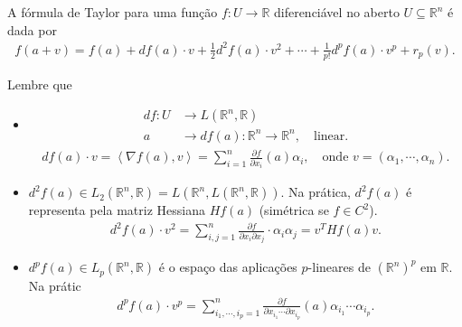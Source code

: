 A fórmula de Taylor para uma função $f:U\to\mathbb{R}$ diferenciável no aberto $U\subseteq \mathbb{R}^{n}$ é dada por
\begin{align*}
  f(a+v)=f(a)+df(a)\cdot v+\frac{1}{2}d^{2}f(a)\cdot v^{2}+\cdots+\frac{1}{p!}d^{p}f(a)\cdot v^{p}+r_p(v).
\end{align*}
\begin{note}
  Lembre que
  \begin{itemize}
    \item 
      \begin{align*}
        df:U&\to L(\mathbb{R}^{n},\mathbb{R})\\
        a&\to df(a):\mathbb{R}^{n}\to\mathbb{R}^{n},\quad\text{linear.}
      \end{align*}
      \begin{align*}
        df(a)\cdot v=\left\langle \nabla f(a),v \right\rangle=\sum_{i=1}^{n}\frac{\partial f}{\partial x_i}(a)\alpha_i,\quad\text{onde }v=(\alpha_1,\cdots,\alpha_n).
      \end{align*}
    \item $d^{2}f(a)\in L_2(\mathbb{R}^{n},\mathbb{R})=L(\mathbb{R}^{n},L(\mathbb{R}^{n},\mathbb{R}))$. Na prática, $d^{2}f(a)$ é representa pela matriz Hessiana $Hf(a)$ (simétrica se $f\in C^{2}$). 
      \begin{align*}
        d^{2}f(a)\cdot v^{2}=\sum_{i,j=1}^{n}\frac{\partial f}{\partial x_i\partial x_j}\cdot\alpha_i\alpha_j=v^{T}Hf(a)v.
      \end{align*}
    \item $d^{p}f(a)\in L_p(\mathbb{R}^{n},\mathbb{R})$ é o espaço das aplicações $p$-lineares de $\left( \mathbb{R}^{n} \right)^{p}$ em $\mathbb{R}$. Na prátic
      \begin{align*}
        d^{p}f(a)\cdot v^{p}=\sum_{i_1,\cdots,i_p=1}^{n}\frac{\partial f}{\partial x_{i_1}\cdots\partial x_{i_p}}(a)\alpha_{i_1}\cdots\alpha_{i_p}.
      \end{align*}
  \end{itemize}
\end{note}
